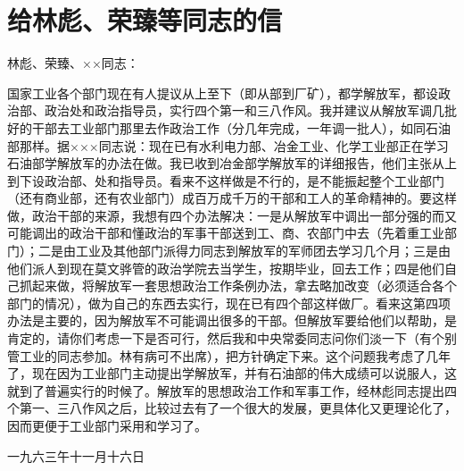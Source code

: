 \section[给林彪、荣臻等同志的信（一九六三年十一月十六日）]{给林彪、荣臻等同志的信}


林彪、荣臻、××同志：

国家工业各个部门现在有人提议从上至下（即从部到厂矿），都学解放军，都设政治部、政治处和政治指导员，实行四个第一和三八作风。我并建议从解放军调几批好的干部去工业部门那里去作政治工作（分几年完成，一年调一批人），如同石油部那样。据×××同志说：现在已有水利电力部、冶金工业、化学工业部正在学习石油部学解放军的办法在做。我已收到冶金部学解放军的详细报告，他们主张从上到下设政治部、处和指导员。看来不这样做是不行的，是不能振起整个工业部门（还有商业部，还有农业部门）成百万成千万的干部和工人的革命精神的。要这样做，政治干部的来源，我想有四个办法解决：一是从解放军中调出一部分强的而又可能调出的政治干部和懂政治的军事干部送到工、商、农部门中去（先着重工业部门）；二是由工业及其他部门派得力同志到解放军的军师团去学习几个月；三是由他们派人到现在莫文骅管的政治学院去当学生，按期毕业，回去工作；四是他们自己抓起来做，将解放军一套思想政治工作条例办法，拿去略加改变（必须适合各个部门的情况），做为自己的东西去实行，现在已有四个部这样做厂。看来这第四项办法是主要的，因为解放军不可能调出很多的干部。但解放军要给他们以帮助，是肯定的，请你们考虑一下是否可行，然后我和中央常委同志问你们淡一下（有个别管工业的同志参加。林有病可不出席），把方针确定下来。这个问题我考虑了几年了，现在因为工业部门主动提出学解放军，并有石油部的伟大成绩可以说服人，这就到了普遍实行的时候了。解放军的思想政治工作和军事工作，经林彪同志提出四个第一、三八作风之后，比较过去有了一个很大的发展，更具体化又更理论化了，因而更便于工业部门采用和学习了。

{\raggedleft 一九六三午十一月十六日\par}


